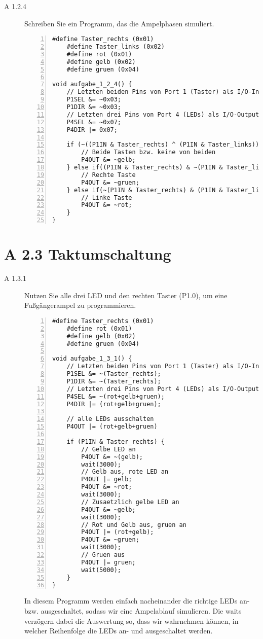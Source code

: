 \documentclass[11pt,a4paper,ngerman]{article}
\begin{document}
\begin{description}
	\item[A 1.2.4] Schreiben Sie ein Programm, das die Ampelphasen simuliert. \\
	
	\begin{lstlisting}[numbers=left]
	#define Taster_rechts (0x01)
	#define Taster_links (0x02)
	#define rot (0x01)
	#define gelb (0x02)
	#define gruen (0x04)
	
void aufgabe_1_2_4() {
	// Letzten beiden Pins von Port 1 (Taster) als I/O-Input verwenden
	P1SEL &= ~0x03;
	P1DIR &= ~0x03;
	// Letzten drei Pins von Port 4 (LEDs) als I/O-Output verwenden
	P4SEL &= ~0x07;
	P4DIR |= 0x07;
	
	if (~((P1IN & Taster_rechts) ^ (P1IN & Taster_links))) {
		// Beide Tasten bzw. keine von beiden
		P4OUT &= ~gelb;
	} else if((P1IN & Taster_rechts) & ~(P1IN & Taster_lins)) {
		// Rechte Taste
		P4OUT &= ~gruen;
	} else if(~(P1IN & Taster_rechts) & (P1IN & Taster_lins)) {
		// Linke Taste
		P4OUT &= ~rot;
	}
}
\end{lstlisting}

\end{description}
\newpage
\section*{A 2.3 Taktumschaltung}
\begin{description}
\item[A 1.3.1] Nutzen Sie alle drei LED und den rechten Taster (P1.0), um eine Fußgängerampel zu programmieren. \\

\begin{lstlisting}[numbers=left]
	#define Taster_rechts (0x01)
	#define rot (0x01)
	#define gelb (0x02)
	#define gruen (0x04)
	
void aufgabe_1_3_1() {
	// Letzten beiden Pins von Port 1 (Taster) als I/O-Input verwenden
	P1SEL &= ~(Taster_rechts);
	P1DIR &= ~(Taster_rechts);
	// Letzten drei Pins von Port 4 (LEDs) als I/O-Output verwenden
	P4SEL &= ~(rot+gelb+gruen);
	P4DIR |= (rot+gelb+gruen);
	
	// alle LEDs ausschalten
	P4OUT |= (rot+gelb+gruen)
	
	if (P1IN & Taster_rechts) {
		// Gelbe LED an
		P4OUT &= ~(gelb);
		wait(3000);
		// Gelb aus, rote LED an
		P4OUT |= gelb;
		P4OUT &= ~rot;
		wait(3000);
		// Zusaetzlich gelbe LED an
		P4OUT &= ~gelb;
		wait(3000);
		// Rot und Gelb aus, gruen an
		P4OUT |= (rot+gelb);
		P4OUT &= ~gruen;
		wait(3000);
		// Gruen aus
		P4OUT |= gruen;
		wait(5000);
	}
}
\end{lstlisting}
In diesem Programm werden einfach nacheinander die richtige LEDs an- bzw. ausgeschaltet, sodass wir eine Ampelablauf simulieren. Die waits verzögern dabei die Auswertung so, dass wir wahrnehmen können, in welcher Reihenfolge die LEDs an- und ausgeschaltet werden.
\end{description}
\end{document}
